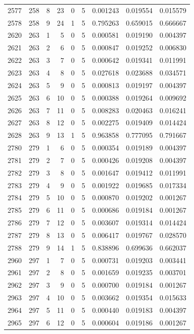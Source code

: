 \begin{longtable}{rrrrrrrrr}
2577 & 258 & 8 & 23 & 0 & 5 & 0.001243 & 0.019554 & 0.015579 \\
2578 & 258 & 9 & 24 & 1 & 5 & 0.795263 & 0.659015 & 0.666667 \\
2620 & 263 & 1 & 5 & 0 & 5 & 0.000581 & 0.019190 & 0.004397 \\
2621 & 263 & 2 & 6 & 0 & 5 & 0.000847 & 0.019252 & 0.006830 \\
2622 & 263 & 3 & 7 & 0 & 5 & 0.000642 & 0.019341 & 0.011991 \\
2623 & 263 & 4 & 8 & 0 & 5 & 0.027618 & 0.023688 & 0.034571 \\
2624 & 263 & 5 & 9 & 0 & 5 & 0.000813 & 0.019197 & 0.004397 \\
2625 & 263 & 6 & 10 & 0 & 5 & 0.000388 & 0.019264 & 0.009692 \\
2626 & 263 & 7 & 11 & 0 & 5 & 0.008283 & 0.020463 & 0.016241 \\
2627 & 263 & 8 & 12 & 0 & 5 & 0.002275 & 0.019409 & 0.014424 \\
2628 & 263 & 9 & 13 & 1 & 5 & 0.963858 & 0.777095 & 0.791667 \\
2780 & 279 & 1 & 6 & 0 & 5 & 0.000354 & 0.019189 & 0.004397 \\
2781 & 279 & 2 & 7 & 0 & 5 & 0.000426 & 0.019208 & 0.004397 \\
2782 & 279 & 3 & 8 & 0 & 5 & 0.001647 & 0.019412 & 0.011991 \\
2783 & 279 & 4 & 9 & 0 & 5 & 0.001922 & 0.019685 & 0.017334 \\
2784 & 279 & 5 & 10 & 0 & 5 & 0.000870 & 0.019202 & 0.001267 \\
2785 & 279 & 6 & 11 & 0 & 5 & 0.000686 & 0.019184 & 0.001267 \\
2786 & 279 & 7 & 12 & 0 & 5 & 0.003607 & 0.019314 & 0.014424 \\
2787 & 279 & 8 & 13 & 0 & 5 & 0.006417 & 0.019767 & 0.028570 \\
2788 & 279 & 9 & 14 & 1 & 5 & 0.838896 & 0.699636 & 0.662037 \\
2960 & 297 & 1 & 7 & 0 & 5 & 0.000731 & 0.019203 & 0.003441 \\
2961 & 297 & 2 & 8 & 0 & 5 & 0.001659 & 0.019235 & 0.003701 \\
2962 & 297 & 3 & 9 & 0 & 5 & 0.000700 & 0.019184 & 0.001267 \\
2963 & 297 & 4 & 10 & 0 & 5 & 0.003662 & 0.019354 & 0.015633 \\
2964 & 297 & 5 & 11 & 0 & 5 & 0.000440 & 0.019183 & 0.004397 \\
2965 & 297 & 6 & 12 & 0 & 5 & 0.000604 & 0.019186 & 0.001267 \\

\end{longtable}
